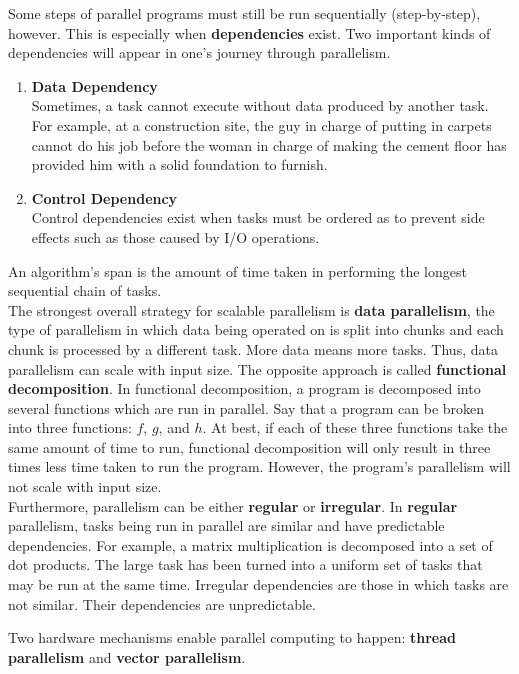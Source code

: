 \documentclass{article}
\begin{document}
    Some steps of parallel programs must still be run sequentially (step-by-step), however. This is especially when \textbf{dependencies} exist. Two important kinds of dependencies will appear in one's journey through parallelism. \\
\begin{enumerate}
\item \textbf{Data Dependency}\\
Sometimes, a task cannot execute without data produced by another task. For example, at a construction site, the guy in charge of putting in carpets cannot do his job before the woman in charge of making the cement floor has provided him with a solid foundation to furnish.
\item \textbf{Control Dependency}\\
Control dependencies exist when tasks must be ordered as to prevent side effects such as those caused by I/O operations. 
\end{enumerate}
An algorithm's span is the amount of time taken in performing the longest sequential chain of tasks. \\

    The strongest overall strategy for scalable parallelism is \textbf{data parallelism}, the type of parallelism in which data being operated on is split into chunks and each chunk is processed by a different task. More data means more tasks. Thus, data parallelism can scale with input size. The opposite approach is called \textbf{functional decomposition}. In functional decomposition, a program is decomposed into several functions which are run in parallel. Say that a program can be broken into three functions: $f$, $g$, and $h$. At best, if each of these three functions take the same amount of time to run, functional decomposition will only result in three times less time taken to run the program. However, the program's parallelism will not scale with input size. \\

    Furthermore, parallelism can be either \textbf{regular} or \textbf{irregular}. In \textbf{regular} parallelism, tasks being run in parallel are similar and have predictable dependencies. For example, a matrix multiplication is decomposed into a set of dot products. The large task has been turned into a uniform set of tasks that may be run at the same time. Irregular dependencies are those in which tasks are not similar. Their dependencies are unpredictable. 

    Two hardware mechanisms enable parallel computing to happen: \textbf{thread parallelism} and \textbf{vector parallelism}. \\
\end{document}
